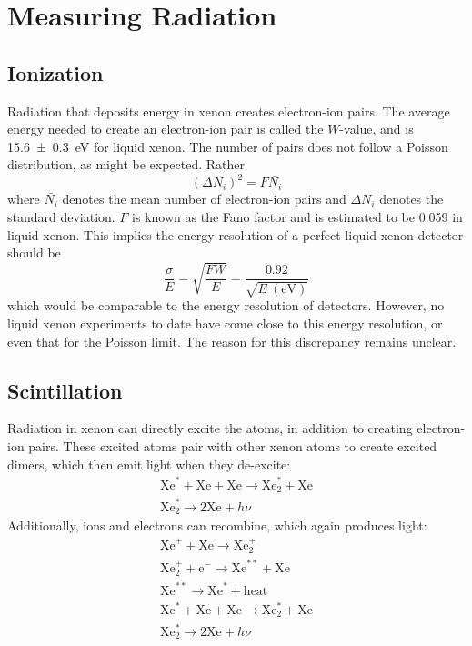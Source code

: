\documentclass[herrin-thesis.tex]{subfiles}
\begin{document}
\section{Measuring Radiation}
\subsection{Ionization}
\label{sec:xe_ionization}
Radiation that deposits energy in xenon creates electron-ion pairs. The average energy needed to create an electron-ion pair is called the \(W\)-value, and is \SI{15.6\pm0.3}{\eV}\cite{Takahashi:1975kx} for liquid xenon. The number of pairs does not follow a Poisson distribution, as might be expected. Rather
\begin{equation}
\left (\Delta N_i \right)^2 = F \bar{N_i}
\end{equation}
where \(\bar{N_i}\) denotes the mean number of electron-ion pairs and \(\Delta N_i\) denotes the standard deviation. \(F\) is known as the Fano factor\cite{Fano:1947ys} and is estimated to be 0.059 in liquid xenon\cite{Doke:1976vn}. This implies the energy resolution of a perfect liquid xenon detector should be
\begin{equation}
\frac{\sigma}{E} = \sqrt{\frac{F W}{E}} = \frac{0.92}{\sqrt{E~(\text{eV})}}
\end{equation}
which would be comparable to the energy resolution of  detectors. However, no liquid xenon experiments to date have come close to this energy resolution, or even that for the Poisson limit. The reason for this discrepancy remains unclear.

\subsection{Scintillation}
Radiation in xenon can directly excite the atoms, in addition to creating electron-ion pairs. These excited atoms  pair with other xenon atoms to create excited dimers, which then emit light when they de-excite:
\begin{equation}
\begin{split}
\text{Xe}^{*} + \text{Xe} + \text{Xe} \rightarrow \text{Xe}^{*}_2 + \text{Xe} \\
\text{Xe}^{*}_2 \rightarrow 2\text{Xe} + h\nu
\end{split}
\end{equation}
Additionally, ions and electrons can recombine, which again produces light:
\begin{equation}
\begin{split}
\text{Xe}^{+} + \text{Xe} \rightarrow \text{Xe}^{+}_2 \\
\text{Xe}^{+}_2 + \text{e}^{-} \rightarrow \text{Xe}^{**} + \text{Xe} \\
\text{Xe}^{**} \rightarrow \text{Xe}^{*} + \text{heat} \\
\text{Xe}^{*} + \text{Xe} + \text{Xe} \rightarrow \text{Xe}^{*}_2 + \text{Xe} \\
\text{Xe}^{*}_2 \rightarrow 2\text{Xe} + h\nu
\end{split}
\end{equation}
\end{document}
